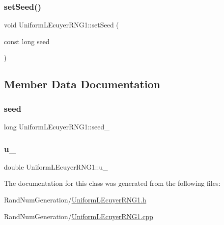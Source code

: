 \subsubsection{\texorpdfstring{set\+Seed()}{setSeed()}}
{\footnotesize\ttfamily void Uniform\+L\+Ecuyer\+R\+N\+G1\+::set\+Seed (\begin{DoxyParamCaption}\item[{const long}]{seed }\end{DoxyParamCaption})}



\subsection{Member Data Documentation}
\hypertarget{class_uniform_l_ecuyer_r_n_g1_ab722b90ba6d65dea6874ccede2edc921}{}\label{class_uniform_l_ecuyer_r_n_g1_ab722b90ba6d65dea6874ccede2edc921} 
\subsubsection{\texorpdfstring{seed\+\_\+}{seed\_}}
{\footnotesize\ttfamily long Uniform\+L\+Ecuyer\+R\+N\+G1\+::seed\+\_\+\hspace{0.3cm}{\ttfamily [private]}}

\hypertarget{class_uniform_l_ecuyer_r_n_g1_ae14608c81e072a8f46ef2dd9b865e90c}{}\label{class_uniform_l_ecuyer_r_n_g1_ae14608c81e072a8f46ef2dd9b865e90c} 
\subsubsection{\texorpdfstring{u\+\_\+}{u\_}}
{\footnotesize\ttfamily double Uniform\+L\+Ecuyer\+R\+N\+G1\+::u\+\_\+\hspace{0.3cm}{\ttfamily [private]}}



The documentation for this class was generated from the following files\+:\begin{DoxyCompactItemize}
\item 
Rand\+Num\+Generation/\hyperlink{_uniform_l_ecuyer_r_n_g1_8h}{Uniform\+L\+Ecuyer\+R\+N\+G1.\+h}\item 
Rand\+Num\+Generation/\hyperlink{_uniform_l_ecuyer_r_n_g1_8cpp}{Uniform\+L\+Ecuyer\+R\+N\+G1.\+cpp}\end{DoxyCompactItemize}
